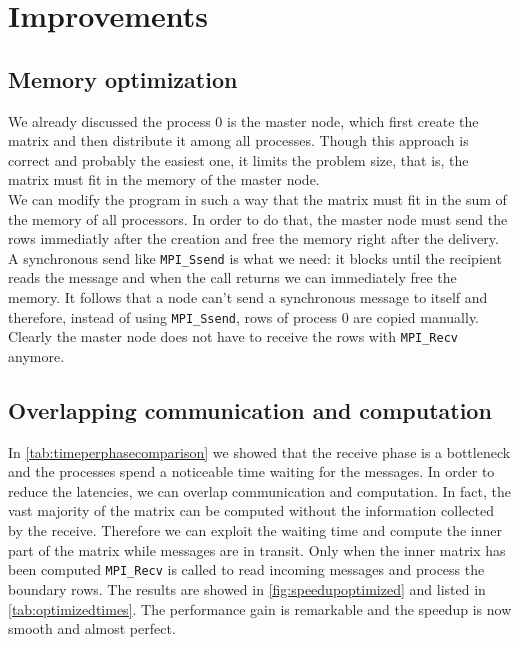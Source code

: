 \documentclass{article}
\begin{document}
\section{Improvements}

\subsection{Memory optimization}
We already discussed the process 0 is the master node, which first create the matrix and then distribute it among all processes. Though this approach is correct and probably the easiest one, it limits the problem size, that is, the matrix must fit in the memory of the master node. \\
We can modify the program in such a way that the matrix must fit in the sum of the memory of all processors. In order to do that, the master node must send the rows immediatly after the creation and free the memory right after the delivery. A synchronous send like \texttt{MPI\_Ssend} is what we need: it blocks until the recipient reads the message and when the call returns we can immediately free the memory. It follows that a node can't send a synchronous message to itself and therefore, instead of using \texttt{MPI\_Ssend}, rows of process 0 are copied manually. Clearly the master node does not have to receive the rows with \texttt{MPI\_Recv} anymore.


\subsection{Overlapping communication and computation} \label{sec:overlappingcommcomp}
In \autoref{tab:timeperphasecomparison} we showed that the receive phase is a bottleneck and the processes spend a noticeable time waiting for the messages. In order to reduce the latencies, we can overlap communication and computation. In fact, the vast majority of the matrix can be computed without the information collected by the receive. Therefore we can exploit the waiting time and compute the inner part of the matrix while messages are in transit. Only when the inner matrix has been computed \texttt{MPI\_Recv} is called to read incoming messages and process the boundary rows. The results are showed in \autoref{fig:speedupoptimized} and listed in \autoref{tab:optimizedtimes}. The performance gain is remarkable and the speedup is now smooth and almost perfect.
\end{document}

